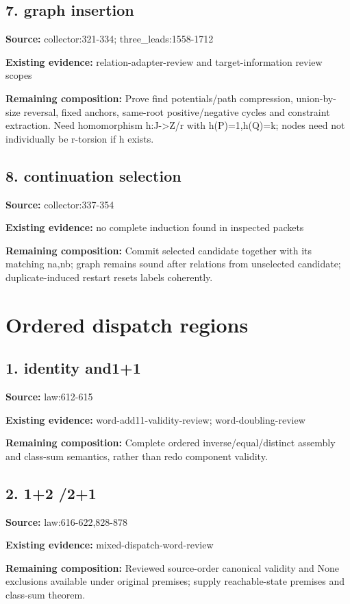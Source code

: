 \documentclass[10pt]{article}
\begin{document}
\subsection*{7. graph insertion}
\textbf{Source:} collector:321-334; three\_leads:1558-1712\par
\textbf{Existing evidence:} relation-adapter-review and target-information review scopes\par
\textbf{Remaining composition:} Prove find potentials/path compression, union-by-size reversal, fixed anchors, same-root positive/negative cycles and constraint extraction. Need homomorphism h:J->Z/r with h(P)=1,h(Q)=k; nodes need not individually be r-torsion if h exists.\par
\subsection*{8. continuation selection}
\textbf{Source:} collector:337-354\par
\textbf{Existing evidence:} no complete induction found in inspected packets\par
\textbf{Remaining composition:} Commit selected candidate together with its matching na,nb; graph remains sound after relations from unselected candidate; duplicate-induced restart resets labels coherently.\par
\section*{Ordered dispatch regions}
\subsection*{1. identity and1+1}
\textbf{Source:} law:612-615\par
\textbf{Existing evidence:} word-add11-validity-review; word-doubling-review\par
\textbf{Remaining composition:} Complete ordered inverse/equal/distinct assembly and class-sum semantics, rather than redo component validity.\par
\subsection*{2. 1+2 /2+1}
\textbf{Source:} law:616-622,828-878\par
\textbf{Existing evidence:} mixed-dispatch-word-review\par
\textbf{Remaining composition:} Reviewed source-order canonical validity and None exclusions available under original premises; supply reachable-state premises and class-sum theorem.\par
\end{document}
